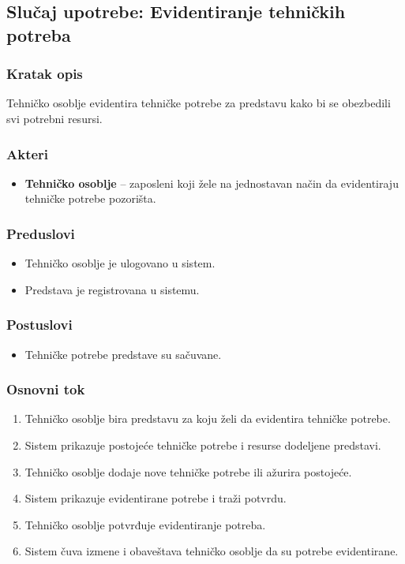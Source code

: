 \subsection{Slučaj upotrebe: Evidentiranje tehničkih potreba}

\subsubsection*{Kratak opis}
Tehničko osoblje evidentira tehničke potrebe za predstavu kako bi se obezbedili svi potrebni resursi.

\subsubsection*{Akteri}
\begin{itemize}
    \item \textbf{Tehničko osoblje} -- zaposleni koji žele na jednostavan način da evidentiraju tehničke potrebe pozorišta.
\end{itemize}

\subsubsection*{Preduslovi}
\begin{itemize}
    \item Tehničko osoblje je ulogovano u sistem.
    \item Predstava je registrovana u sistemu.
\end{itemize}

\subsubsection*{Postuslovi}
\begin{itemize}
    \item Tehničke potrebe predstave su sačuvane.
\end{itemize}

\subsubsection*{Osnovni tok}
\begin{enumerate}
    \item Tehničko osoblje bira predstavu za koju želi da evidentira tehničke potrebe.
    \item Sistem prikazuje postojeće tehničke potrebe i resurse dodeljene predstavi.
    \item Tehničko osoblje dodaje nove tehničke potrebe ili ažurira postojeće.
    \item Sistem prikazuje evidentirane potrebe i traži potvrdu.
    \item Tehničko osoblje potvrđuje evidentiranje potreba.
    \item Sistem čuva izmene i obaveštava tehničko osoblje da su potrebe evidentirane.
\end{enumerate}

